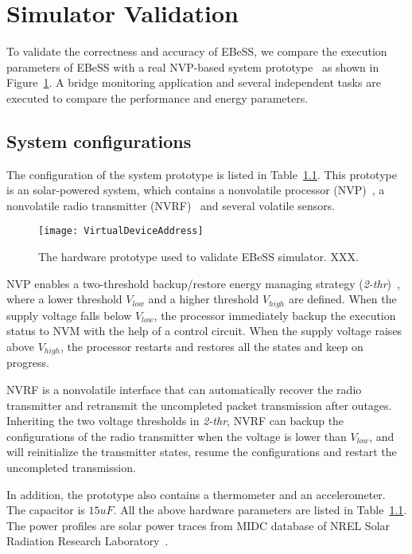\section{Simulator Validation}	\label{sec:valid}
%
To validate the correctness and accuracy of EBeSS, we compare the execution parameters of EBeSS with a real NVP-based system prototype~\cite{wang2017a130nm} as shown in Figure~\ref{fig:HardwarePrototype}.
A bridge monitoring application and several independent tasks are executed to compare the performance and energy parameters.

\subsection{System configurations}
The configuration of the system prototype is listed in Table~\ref{}. 
This prototype is an solar-powered system, which contains a nonvolatile processor (NVP)~\cite{wang20123us,Liu2015Ambient}, a nonvolatile radio transmitter (NVRF)~\cite{wang2017a130nm} and several volatile sensors.

\begin{figure}[!htpb]
	\centering
	\vspace{-5pt}
	\texttt{[image: VirtualDeviceAddress]}
	\vspace{-5pt}
	\caption{The hardware prototype used to validate EBeSS simulator. XXX.}	\label{fig:HardwarePrototype}
\end{figure}

NVP enables a two-threshold backup/restore energy managing strategy (\emph{2-thr})~\cite{wang20123us,gu2016nvpsim}, where a lower threshold $V_{low}$ and a higher threshold $V_{high}$ are defined.
When the supply voltage falls below $V_{low}$, the processor immediately backup the execution status to NVM with the help of a control circuit.
When the supply voltage raises above $V_{high}$, the processor restarts and restores all the states and keep on progress.

NVRF is a nonvolatile interface that can automatically recover the radio transmitter and retransmit the uncompleted packet transmission after outages.
Inheriting the two voltage thresholds in \emph{2-thr}, NVRF can backup the configurations of the radio transmitter when the voltage is lower than $V_{low}$, and will reinitialize the transmitter states, resume the configurations and restart the uncompleted transmission.

In addition, the prototype also contains a thermometer and an accelerometer. 
The capacitor is $15uF$. 
All the above hardware parameters are listed in Table~\ref{}.
The power profiles are solar power traces from MIDC database of NREL Solar Radiation Research Laboratory~\cite{midc2015solar}.

